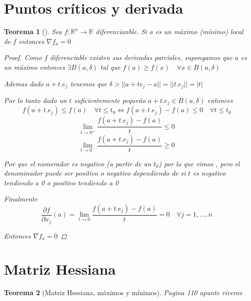 \documentclass{article}
\theoremstyle{break}
\newtheorem{theorem}{Teorema}[section]
\begin{document}
\section{Puntos críticos y derivada}
\begin{theorem}[]
  Sea $f:\mathbb{R}^{n} \longrightarrow \mathbb{R} $ diferencianble. Si $a$ es un máximo (mínimo) local de $f$ entonces $\nabla f_a = 0$
  \begin{proof}
    Como $f$ diferenciable existen sus derivadas parciales, supongamos que $a$ es un máximo entonces $\exists B(a,\delta)$ tal que 
    $f(a) \geq f(x) \quad \forall x \in B(a,\delta)$

    Ademas dado $a + t.e_j$ tenemos que $\delta > ||a+te_j -a|| = ||t.e_j|| = |t|$ 

    Por lo tanto dado un $t$ suficientemente pequeño $a+t.e_j \in B(a,\delta)$ entonces 
    $$f(a+t.e_j) \leq f(a) \quad \forall t\leq t_0 \iff f(a+t.e_j) - f(a) \leq 0 \quad \forall t\leq t_0 $$
    $$\lim_{t \rightarrow 0^+} \frac{f(a+t.e_j) - f(a)}{t} \leq 0 $$
    $$\lim_{t \rightarrow 0^-} \frac{f(a+t.e_j) - f(a)}{t} \geq 0 $$

    Por que el numerador es negativo (a partir de un $t_0$) por lo que vimos , pero el 
    denominador puede ser positivo o negativo dependiendo de si $t$ es negativo tendiendo a 0 o positivo tendiendo a 0

    Finalmente $$\frac{\partial f}{\partial x_j}(a)=\lim_{t \rightarrow 0} \frac{f(a+t.e_j) - f(a)}{t} = 0 \quad \forall j=1,\ldots,n$$

    Entonces $\nabla f_a = 0$
  \end{proof}
\end{theorem}

\section{Matriz Hessiana}
\begin{theorem}[Matriz Hessiana, máximos y mínimos]
  Pagina 110 apunte riveros
\end{theorem}
\end{document}
